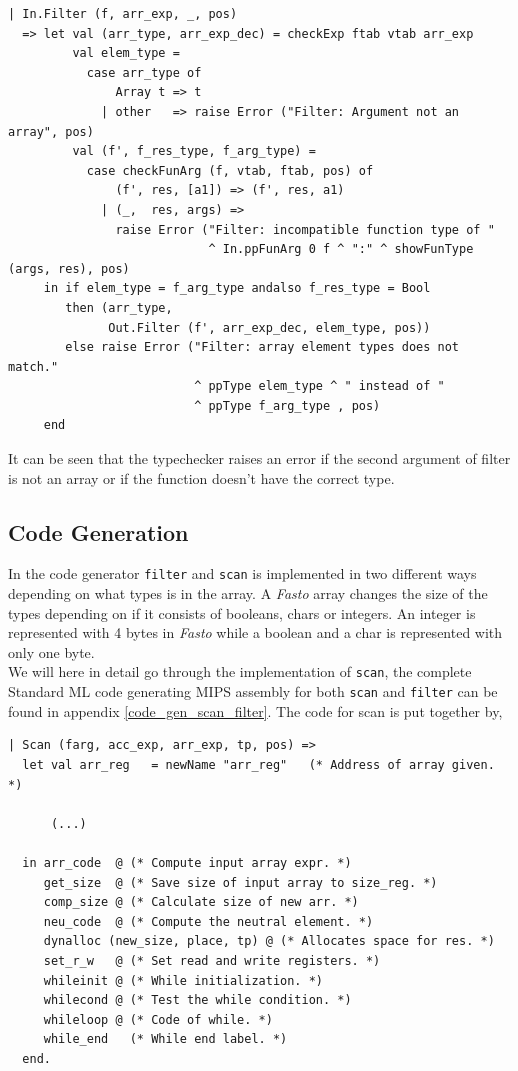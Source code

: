 \documentclass[11pt]{article}
\begin{document}
    \begin{lstlisting}[basicstyle=\small]
| In.Filter (f, arr_exp, _, pos)
  => let val (arr_type, arr_exp_dec) = checkExp ftab vtab arr_exp
         val elem_type =
           case arr_type of
               Array t => t
             | other   => raise Error ("Filter: Argument not an array", pos)
         val (f', f_res_type, f_arg_type) =
           case checkFunArg (f, vtab, ftab, pos) of
               (f', res, [a1]) => (f', res, a1)
             | (_,  res, args) =>
               raise Error ("Filter: incompatible function type of "
                            ^ In.ppFunArg 0 f ^ ":" ^ showFunType (args, res), pos)
     in if elem_type = f_arg_type andalso f_res_type = Bool
        then (arr_type,
              Out.Filter (f', arr_exp_dec, elem_type, pos))
        else raise Error ("Filter: array element types does not match."
                          ^ ppType elem_type ^ " instead of "
                          ^ ppType f_arg_type , pos)
     end
    \end{lstlisting}

    It can be seen that the typechecker raises an error if the second argument
    of filter is not an array or if the function doesn't have the correct type.

    \subsection{Code Generation}
    In the code generator \texttt{filter} and \texttt{scan} is implemented in
    two different ways depending on what types is in the array.  A
    \textit{Fasto} array changes the size of the types depending on if it
    consists of booleans, chars or integers.  An integer is represented with 4
    bytes in \textit{Fasto} while a boolean and a char is represented with only
    one byte. \\

    We will here in detail go through the implementation of \texttt{scan}, the
    complete Standard ML code generating MIPS assembly for both \texttt{scan}
    and \texttt{filter} can be found in appendix \ref{code_gen_scan_filter}.
    The code for scan is put together by,

    \begin{lstlisting}[basicstyle=\small]
| Scan (farg, acc_exp, arr_exp, tp, pos) =>
  let val arr_reg   = newName "arr_reg"   (* Address of array given. *)

      (...)

  in arr_code  @ (* Compute input array expr. *)
     get_size  @ (* Save size of input array to size_reg. *)
     comp_size @ (* Calculate size of new arr. *)
     neu_code  @ (* Compute the neutral element. *)
     dynalloc (new_size, place, tp) @ (* Allocates space for res. *)
     set_r_w   @ (* Set read and write registers. *)
     whileinit @ (* While initialization. *)
     whilecond @ (* Test the while condition. *)
     whileloop @ (* Code of while. *)
     while_end   (* While end label. *)
  end.
    \end{lstlisting}
\end{document}
